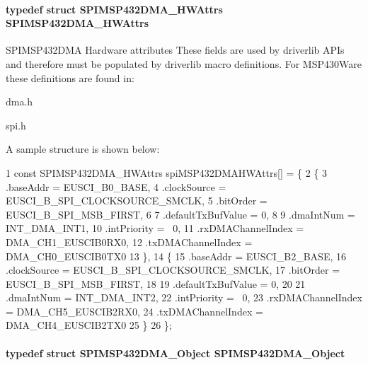 \paragraph[{S\+P\+I\+M\+S\+P432\+D\+M\+A\+\_\+\+H\+W\+Attrs}]{\setlength{\rightskip}{0pt plus 5cm}typedef struct {\bf S\+P\+I\+M\+S\+P432\+D\+M\+A\+\_\+\+H\+W\+Attrs}  {\bf S\+P\+I\+M\+S\+P432\+D\+M\+A\+\_\+\+H\+W\+Attrs}}\label{_s_p_i_m_s_p432_d_m_a_8h_a3c134f41d4b331c52e9689b1fa4df451}


S\+P\+I\+M\+S\+P432\+D\+M\+A Hardware attributes These fields are used by driverlib A\+P\+Is and therefore must be populated by driverlib macro definitions. For M\+S\+P430\+Ware these definitions are found in\+: 


\begin{DoxyItemize}
\item dma.\+h
\item spi.\+h
\end{DoxyItemize}

A sample structure is shown below\+: 
\begin{DoxyCode}
1 const SPIMSP432DMA\_HWAttrs spiMSP432DMAHWAttrs[] = \{
2     \{
3         .baseAddr = EUSCI\_B0\_BASE,
4         .clockSource = EUSCI\_B\_SPI\_CLOCKSOURCE\_SMCLK,
5         .bitOrder = EUSCI\_B\_SPI\_MSB\_FIRST,
6 
7         .defaultTxBufValue = 0,
8 
9         .dmaIntNum = INT\_DMA\_INT1,
10         .intPriority = ~0,
11         .rxDMAChannelIndex = DMA\_CH1\_EUSCIB0RX0,
12         .txDMAChannelIndex = DMA\_CH0\_EUSCIB0TX0
13     \},
14     \{
15         .baseAddr = EUSCI\_B2\_BASE,
16         .clockSource = EUSCI\_B\_SPI\_CLOCKSOURCE\_SMCLK,
17         .bitOrder = EUSCI\_B\_SPI\_MSB\_FIRST,
18 
19         .defaultTxBufValue = 0,
20 
21         .dmaIntNum = INT\_DMA\_INT2,
22         .intPriority = ~0,
23         .rxDMAChannelIndex = DMA\_CH5\_EUSCIB2RX0,
24         .txDMAChannelIndex = DMA\_CH4\_EUSCIB2TX0
25     \}
26 \};
\end{DoxyCode}
\paragraph[{S\+P\+I\+M\+S\+P432\+D\+M\+A\+\_\+\+Object}]{\setlength{\rightskip}{0pt plus 5cm}typedef struct {\bf S\+P\+I\+M\+S\+P432\+D\+M\+A\+\_\+\+Object}  {\bf S\+P\+I\+M\+S\+P432\+D\+M\+A\+\_\+\+Object}}\label{_s_p_i_m_s_p432_d_m_a_8h_a8ace92c08f232b6bf494eaf2636f5f40}


